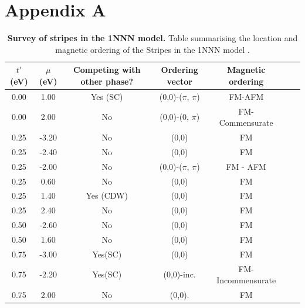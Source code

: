 \documentclass[11pt]{article}
\begin{document}
\newpage



\appendix
\section{Appendix A}
\label{appendix:A}

\begin{table}[h]
    \centering
    \begin{tabular}{|c|c|c|c|c|c|c|}
        \hline
       $t'$(eV) & $\mu$ (eV) & Competing with other phase?& Ordering vector & Magnetic ordering  \\
        \hline
        0.00 & 1.00 & Yes (SC) & (0,0)-($\pi$, $\pi$)& FM-AFM\\
        \hline
        0.00 & 2.00 &  No  & (0,0)-(0, $\pi$)  & FM-Commensurate\\
        \hline
        0.25 & -3.20 & No  & (0,0)  & FM\\
        \hline
        0.25 & -2.40 & No  & (0,0) & FM\\
        \hline
        0.25 & -2.00 & No  & (0,0)-($\pi$, $\pi$)  & FM - AFM\\
        \hline
        0.25 & 0.60 &  No  & (0,0)  & FM \\
        \hline
        0.25 & 1.40 &  Yes (CDW)  & (0,0)  & FM \\
        \hline
        0.25 & 2.40 &  No  & (0,0)  & FM \\
        \hline
        0.50 & -2.60 &  No  & (0,0)  & FM \\
        \hline
        0.50 & 1.60 &  No  & (0,0)  & FM \\
        \hline
        0.75 & -3.00 &  Yes(SC)  & (0,0)  & FM \\
        \hline
        0.75 & -2.20 &  Yes(SC)  & (0,0)-inc. & FM- Incommensurate \\
        \hline
        0.75 & 2.00 &  No  & (0,0). & FM \\
        \hline  
        \hline
    \end{tabular}
    \caption{\textbf{Survey of stripes in the 1NNN model.} Table summarising the location and magnetic ordering of the Stripes in the 1NNN model .}
    \label{tab:StripesSummary}
\end{table}
\end{document}
